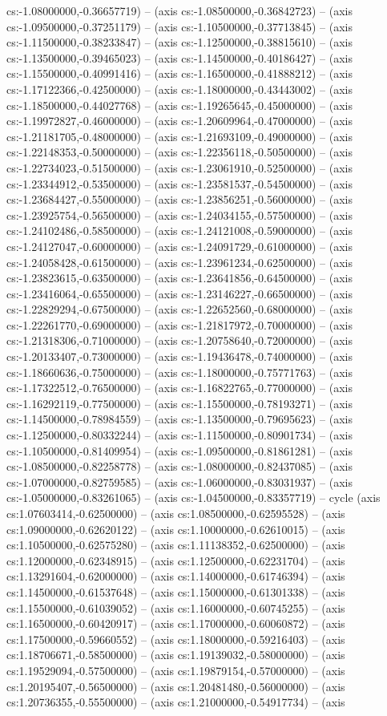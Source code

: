 cs:-1.08000000,-0.36657719) -- (axis cs:-1.08500000,-0.36842723) -- (axis cs:-1.09500000,-0.37251179) -- (axis cs:-1.10500000,-0.37713845) -- (axis cs:-1.11500000,-0.38233847) -- (axis cs:-1.12500000,-0.38815610) -- (axis cs:-1.13500000,-0.39465023) -- (axis cs:-1.14500000,-0.40186427) -- (axis cs:-1.15500000,-0.40991416) -- (axis cs:-1.16500000,-0.41888212) -- (axis cs:-1.17122366,-0.42500000) -- (axis cs:-1.18000000,-0.43443002) -- (axis cs:-1.18500000,-0.44027768) -- (axis cs:-1.19265645,-0.45000000) -- (axis cs:-1.19972827,-0.46000000) -- (axis cs:-1.20609964,-0.47000000) -- (axis cs:-1.21181705,-0.48000000) -- (axis cs:-1.21693109,-0.49000000) -- (axis cs:-1.22148353,-0.50000000) -- (axis cs:-1.22356118,-0.50500000) -- (axis cs:-1.22734023,-0.51500000) -- (axis cs:-1.23061910,-0.52500000) -- (axis cs:-1.23344912,-0.53500000) -- (axis cs:-1.23581537,-0.54500000) -- (axis cs:-1.23684427,-0.55000000) -- (axis cs:-1.23856251,-0.56000000) -- (axis cs:-1.23925754,-0.56500000) -- (axis cs:-1.24034155,-0.57500000) -- (axis cs:-1.24102486,-0.58500000) -- (axis cs:-1.24121008,-0.59000000) -- (axis cs:-1.24127047,-0.60000000) -- (axis cs:-1.24091729,-0.61000000) -- (axis cs:-1.24058428,-0.61500000) -- (axis cs:-1.23961234,-0.62500000) -- (axis cs:-1.23823615,-0.63500000) -- (axis cs:-1.23641856,-0.64500000) -- (axis cs:-1.23416064,-0.65500000) -- (axis cs:-1.23146227,-0.66500000) -- (axis cs:-1.22829294,-0.67500000) -- (axis cs:-1.22652560,-0.68000000) -- (axis cs:-1.22261770,-0.69000000) -- (axis cs:-1.21817972,-0.70000000) -- (axis cs:-1.21318306,-0.71000000) -- (axis cs:-1.20758640,-0.72000000) -- (axis cs:-1.20133407,-0.73000000) -- (axis cs:-1.19436478,-0.74000000) -- (axis cs:-1.18660636,-0.75000000) -- (axis cs:-1.18000000,-0.75771763) -- (axis cs:-1.17322512,-0.76500000) -- (axis cs:-1.16822765,-0.77000000) -- (axis cs:-1.16292119,-0.77500000) -- (axis cs:-1.15500000,-0.78193271) -- (axis cs:-1.14500000,-0.78984559) -- (axis cs:-1.13500000,-0.79695623) -- (axis cs:-1.12500000,-0.80332244) -- (axis cs:-1.11500000,-0.80901734) -- (axis cs:-1.10500000,-0.81409954) -- (axis cs:-1.09500000,-0.81861281) -- (axis cs:-1.08500000,-0.82258778) -- (axis cs:-1.08000000,-0.82437085) -- (axis cs:-1.07000000,-0.82759585) -- (axis cs:-1.06000000,-0.83031937) -- (axis cs:-1.05000000,-0.83261065) -- (axis cs:-1.04500000,-0.83357719) -- cycle (axis cs:1.07603414,-0.62500000) -- (axis cs:1.08500000,-0.62595528) -- (axis cs:1.09000000,-0.62620122) -- (axis cs:1.10000000,-0.62610015) -- (axis cs:1.10500000,-0.62575280) -- (axis cs:1.11138352,-0.62500000) -- (axis cs:1.12000000,-0.62348915) -- (axis cs:1.12500000,-0.62231704) -- (axis cs:1.13291604,-0.62000000) -- (axis cs:1.14000000,-0.61746394) -- (axis cs:1.14500000,-0.61537648) -- (axis cs:1.15000000,-0.61301338) -- (axis cs:1.15500000,-0.61039052) -- (axis cs:1.16000000,-0.60745255) -- (axis cs:1.16500000,-0.60420917) -- (axis cs:1.17000000,-0.60060872) -- (axis cs:1.17500000,-0.59660552) -- (axis cs:1.18000000,-0.59216403) -- (axis cs:1.18706671,-0.58500000) -- (axis cs:1.19139032,-0.58000000) -- (axis cs:1.19529094,-0.57500000) -- (axis cs:1.19879154,-0.57000000) -- (axis cs:1.20195407,-0.56500000) -- (axis cs:1.20481480,-0.56000000) -- (axis cs:1.20736355,-0.55500000) -- (axis cs:1.21000000,-0.54917734) -- (axis 
